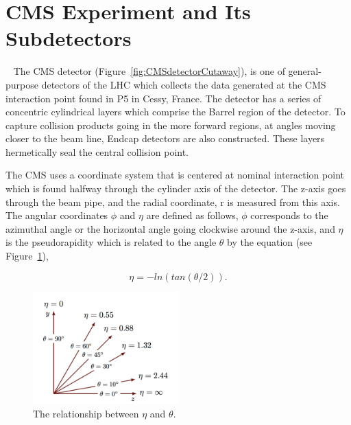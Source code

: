 
\section{CMS Experiment and Its Subdetectors}~\label{sec:CMSDetector}
The CMS detector (Figure~\ref{fig:CMSdetectorCutaway}), is one of general-purpose detectors of the LHC which collects the data generated at the CMS interaction point found in P5 in Cessy, France. The detector has a series of concentric cylindrical layers which comprise the Barrel region of the detector. To capture collision products going in the more forward regions, at angles moving closer to the beam line, Endcap detectors are also constructed. These layers hermetically seal the central collision point.

The CMS uses a coordinate system that is centered at nominal interaction point which is found halfway through the cylinder axis of the detector. The z-axis goes through the beam pipe, and the radial coordinate, r is measured from this axis. The angular coordinates $\phi$ and $\eta$ are defined as follows, $\phi$ corresponds to the azimuthal angle or the horizontal angle going clockwise around the z-axis, and $\eta$ is the pseudorapidity which is related to the angle $\theta$ by the equation (see Figure~\ref{fig:etatheta}),

\begin{equation}
    \eta = -ln (tan(\theta/2)).
\end{equation}

\begin{figure}[tbp!]
\begin{center}
\includegraphics[angle=0,width=0.50\textwidth]{fig/pseudorapidity.png}
\end{center}
\caption{The relationship between $\eta$ and $\theta$.
}
\label{fig:etatheta}
\end{figure}


